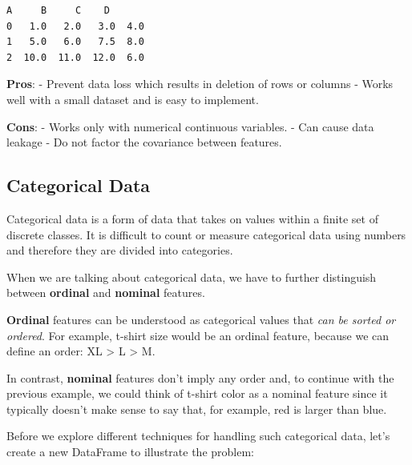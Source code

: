 \documentclass[11pt]{article}
\makeatletter
\newcommand{\boxspacing}{\kern\kvtcb@left@rule\kern\kvtcb@boxsep}
\newcommand{\prompt}[4]{
        {\ttfamily\llap{{\color{#2}[#3]:\hspace{3pt}#4}}\vspace{-\baselineskip}}
    }
\makeatother
\begin{document}
            \begin{tcolorbox}[breakable, size=fbox, boxrule=.5pt, pad at break*=1mm, opacityfill=0]
\prompt{Out}{outcolor}{5}{\boxspacing}
\begin{Verbatim}[commandchars=\\\{\}]
      A     B     C    D
0   1.0   2.0   3.0  4.0
1   5.0   6.0   7.5  8.0
2  10.0  11.0  12.0  6.0
\end{Verbatim}
\end{tcolorbox}
        
    \textbf{Pros}: - Prevent data loss which results in deletion of rows or
columns - Works well with a small dataset and is easy to implement.

\textbf{Cons}: - Works only with numerical continuous variables. - Can
cause data leakage - Do not factor the covariance between features.

    \hypertarget{categorical-data}{%
\subsection{Categorical Data}\label{categorical-data}}

    Categorical data is a form of data that takes on values within a finite
set of discrete classes. It is difficult to count or measure categorical
data using numbers and therefore they are divided into categories.

When we are talking about categorical data, we have to further
distinguish between \textbf{ordinal} and \textbf{nominal} features.

\textbf{Ordinal} features can be understood as categorical values that
\emph{can be sorted or ordered}. For example, t-shirt size would be an
ordinal feature, because we can define an order: XL \textgreater{} L
\textgreater{} M.

In contrast, \textbf{nominal} features don't imply any order and, to
continue with the previous example, we could think of t-shirt color as a
nominal feature since it typically doesn't make sense to say that, for
example, red is larger than blue.

Before we explore different techniques for handling such categorical
data, let's create a new DataFrame to illustrate the problem:
\end{document}
